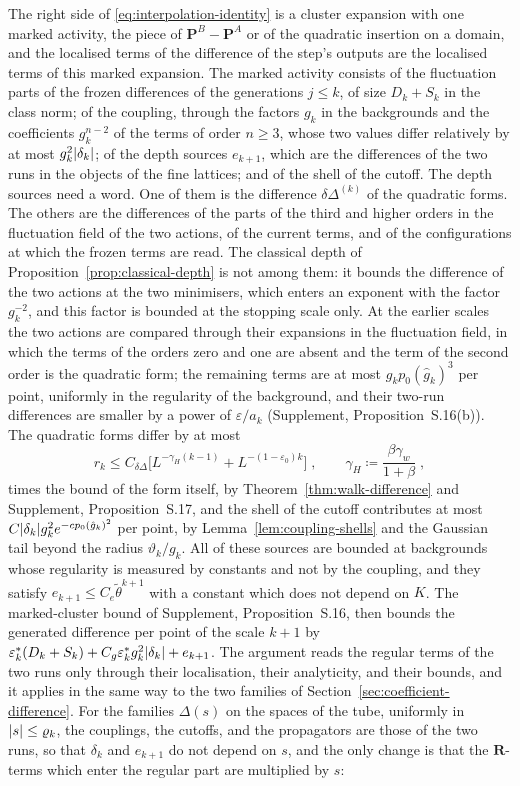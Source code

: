 \documentclass[11pt]{preprint}
\DeclarePairedDelimiter{\abs}{\lvert}{\rvert}
\numberwithin{equation}{section}
\theoremstyle{definition}
\theoremstyle{remark}
\theoremstyle{plain}
\begin{document}
The right side of \eqref{eq:interpolation-identity} is a cluster expansion with one marked activity, the piece of $\mathbf P^B - \mathbf P^A$ or of the quadratic insertion on a domain, and the localised terms of the difference of the step's outputs are the localised terms of this marked expansion. The marked activity consists of the fluctuation parts of the frozen differences of the generations $j \leq k$, of size $D_k + S_k$ in the class norm; of the coupling, through the factors $g_k$ in the backgrounds and the coefficients $g_k^{n-2}$ of the terms of order $n \geq 3$, whose two values differ relatively by at most $g_k^2\abs{\delta_k}$; of the depth sources $e_{k+1}$, which are the differences of the two runs in the objects of the fine lattices; and of the shell of the cutoff. The depth sources need a word. One of them is the difference $\delta\Delta^{(k)}$ of the quadratic forms. The others are the differences of the parts of the third and higher orders in the fluctuation field of the two actions, of the current terms, and of the configurations at which the frozen terms are read. The classical depth of Proposition~\ref{prop:classical-depth} is not among them: it bounds the difference of the two actions at the two minimisers, which enters an exponent with the factor $g_k^{-2}$, and this factor is bounded at the stopping scale only. At the earlier scales the two actions are compared through their expansions in the fluctuation field, in which the terms of the orders zero and one are absent and the term of the second order is the quadratic form; the remaining terms are at most $g_kp_0(\hat g_k)^3$ per point, uniformly in the regularity of the background, and their two-run differences are smaller by a power of $\varepsilon/a_k$ (Supplement, Proposition~S.16(b)). The quadratic forms differ by at most
\begin{equation}\label{eq:gaussian-depth}
    r_k \leq C_{\delta\Delta}\bigl[L^{-\gamma_H(k-1)} + L^{-(1-\varepsilon_0)k}\bigr]\;,
    \qquad
    \gamma_H \coloneqq \frac{\beta\gamma_w}{1 + \beta}\;,
\end{equation}
times the bound of the form itself, by Theorem~\ref{thm:walk-difference} and Supplement, Proposition~S.17, and the shell of the cutoff contributes at most $C\abs{\delta_k}g_k^2e^{-cp_0(\hat g_k)^2}$ per point, by Lemma~\ref{lem:coupling-shells} and the Gaussian tail beyond the radius $\vartheta_k/g_k$. All of these sources are bounded at backgrounds whose regularity is measured by constants and not by the coupling, and they satisfy $e_{k+1} \leq C_e\tilde\theta^{k+1}$ with a constant which does not depend on $K$. The marked-cluster bound of Supplement, Proposition~S.16, then bounds the generated difference per point of the scale $k + 1$ by $\varepsilon^*_k(D_k + S_k) + C_g\varepsilon^*_kg_k^2\abs{\delta_k} + e_{k+1}$. The argument reads the regular terms of the two runs only through their localisation, their analyticity, and their bounds, and it applies in the same way to the two families of Section~\ref{sec:coefficient-difference}. For the families $\Delta(s)$ on the spaces of the tube, uniformly in $\abs s \leq \varrho_k$, the couplings, the cutoffs, and the propagators are those of the two runs, so that $\delta_k$ and $e_{k+1}$ do not depend on $s$, and the only change is that the $\mathbf R$-terms which enter the regular part are multiplied by $s$:
\end{document}
